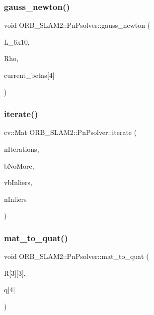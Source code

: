 \subsubsection{\texorpdfstring{gauss\+\_\+newton()}{gauss\_newton()}}
{\footnotesize\ttfamily void O\+R\+B\+\_\+\+S\+L\+A\+M2\+::\+Pn\+Psolver\+::gauss\+\_\+newton (\begin{DoxyParamCaption}\item[{const Cv\+Mat $\ast$}]{L\+\_\+6x10,  }\item[{const Cv\+Mat $\ast$}]{Rho,  }\item[{double}]{current\+\_\+betas\mbox{[}4\mbox{]} }\end{DoxyParamCaption})\hspace{0.3cm}{\ttfamily [private]}}

\mbox{\label{class_o_r_b___s_l_a_m2_1_1_pn_psolver_abbef2ac776747661112246e85667f452}} 
\subsubsection{\texorpdfstring{iterate()}{iterate()}}
{\footnotesize\ttfamily cv\+::\+Mat O\+R\+B\+\_\+\+S\+L\+A\+M2\+::\+Pn\+Psolver\+::iterate (\begin{DoxyParamCaption}\item[{int}]{n\+Iterations,  }\item[{bool \&}]{b\+No\+More,  }\item[{vector$<$ bool $>$ \&}]{vb\+Inliers,  }\item[{int \&}]{n\+Inliers }\end{DoxyParamCaption})}

\mbox{\label{class_o_r_b___s_l_a_m2_1_1_pn_psolver_a54b16a3fb045afe5425c004ec7b5fa21}} 
\subsubsection{\texorpdfstring{mat\+\_\+to\+\_\+quat()}{mat\_to\_quat()}}
{\footnotesize\ttfamily void O\+R\+B\+\_\+\+S\+L\+A\+M2\+::\+Pn\+Psolver\+::mat\+\_\+to\+\_\+quat (\begin{DoxyParamCaption}\item[{const double}]{R\mbox{[}3\mbox{]}\mbox{[}3\mbox{]},  }\item[{double}]{q\mbox{[}4\mbox{]} }\end{DoxyParamCaption})\hspace{0.3cm}{\ttfamily [private]}}

